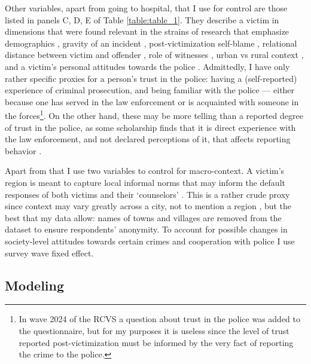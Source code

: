 \documentclass[]{interact}
\theoremstyle{plain}%
\theoremstyle{definition}
\theoremstyle{remark}
\newcommand\citep{\parencite}
\begin{document}
	Other variables, apart from going to hospital, that I use for control are those listed in panels C, D, E of Table \ref{table:table_1}. They describe a victim in dimensions that were found relevant in the strains of research that emphasize demographics \citep{zaykowski2019examining, hart2003reporting, baumer2010reporting, black1973mobilization}, gravity of an incident \citep{skogan1976citizen, skogan1984reporting, gottfredson1979study, tarling2010reporting}, post-victimization self-blame \citep{felson1999victim, kaukinen2002help, knoth2019reporting}, relational distance between victim and offender \citep{felson2016victims, ruback1993comment, kaukinen2004help, brennan2016violence, gartner1995effect}, role of witnesses \citep{felson1999victim},  urban vs rural context \citep{rennison2013context,black1976behavior,laub1981ecological}, and a victim's personal attitudes towards the police \citep{goudriaan2004reporting,boateng2018crime,ann2010neighborhood,warner2007directly,xie2006prior}. Admittedly, I have only rather specific proxies for a person's trust in the police: having a (self-reported) experience of criminal prosecution, and being familiar with the police --- either because one has served in the law enforcement or is acquainted with someone in the forces\footnote{In wave 2024 of the RCVS a question about trust in the police was added to the questionnaire, but for my purposes it is useless since the level of trust reported post-victimization must be informed by the very fact of reporting the crime to the police.}. On the other hand, these may be more telling than a reported degree of trust in the police, as some scholarship finds that it is direct experience with the law enforcement, and not declared perceptions of it, that affects reporting behavior \citep{davis2003willingness}.
	
	Apart from that I use two variables to control for macro-context. A victim's region is meant to capture local informal norms that may inform the default responses of both victims and their `counselors' \citep{goudriaan2004reporting}. This is a rather crude proxy since context may vary greatly across a city, not to mention a region \citep{goudriaan2006neighbourhood, baumer2002neighborhood}, but the best that my data allow: names of towns and villages are removed from the dataset to ensure respondents' anonymity. To account for possible changes in society-level attitudes towards certain crimes and cooperation with police \citep{tarling2010reporting} I use survey wave fixed effect.
	
	\subsection*{Modeling} 
	
\end{document}
